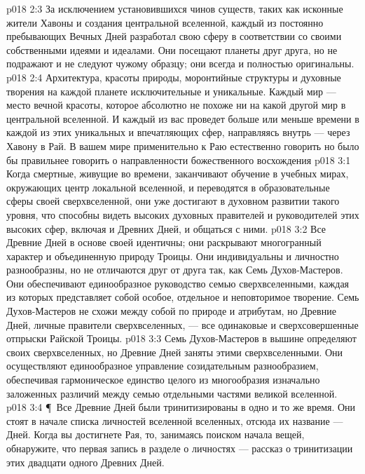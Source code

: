 \vs p018 2:3 За исключением установившихся чинов существ, таких как исконные жители Хавоны и создания центральной вселенной, каждый из постоянно пребывающих Вечных Дней разработал свою сферу в соответствии со своими собственными идеями и идеалами. Они посещают планеты друг друга, но не подражают и не следуют чужому образцу; они всегда и полностью оригинальны.
\vs p018 2:4 Архитектура, красоты природы, моронтийные структуры и духовные творения на каждой планете исключительные и уникальные. Каждый мир --- место вечной красоты, которое абсолютно не похоже ни на какой другой мир в центральной вселенной. И каждый из вас проведет больше или меньше времени в каждой из этих уникальных и впечатляющих сфер, направляясь внутрь --- через Хавону в Рай. В вашем мире применительно к Раю естественно говорить  но было бы правильнее говорить о направленности божественного восхождения 
\vs p018 3:1 Когда смертные, живущие во времени, заканчивают обучение в учебных мирах, окружающих центр локальной вселенной, и переводятся в образовательные сферы своей сверхвселенной, они уже достигают в духовном развитии такого уровня, что способны видеть высоких духовных правителей и руководителей этих высоких сфер, включая и Древних Дней, и общаться с ними.
\vs p018 3:2 Все Древние Дней в основе своей идентичны; они раскрывают многогранный характер и объединенную природу Троицы. Они индивидуальны и личностно разнообразны, но не отличаются друг от друга так, как Семь Духов\hyp{}Мастеров. Они обеспечивают единообразное руководство семью сверхвселенными, каждая из которых представляет собой особое, отдельное и неповторимое творение. Семь Духов\hyp{}Мастеров не схожи между собой по природе и атрибутам, но Древние Дней, личные правители сверхвселенных, --- все одинаковые и сверхсовершенные отпрыски Райской Троицы.
\vs p018 3:3 Семь Духов\hyp{}Мастеров в вышине определяют  своих сверхвселенных, но Древние Дней заняты  этими сверхвселенными. Они осуществляют единообразное управление созидательным разнообразием, обеспечивая гармоническое единство целого из многообразия изначально заложенных различий между семью отдельными частями великой вселенной.
\vs p018 3:4 \P\ Все Древние Дней были тринитизированы в одно и то же время. Они стоят в начале списка личностей вселенной вселенных, отсюда их название ---  Дней. Когда вы достигнете Рая, то, занимаясь поиском начала вещей, обнаружите, что первая запись в разделе о личностях --- рассказ о тринитизации этих двадцати одного Древних Дней.
